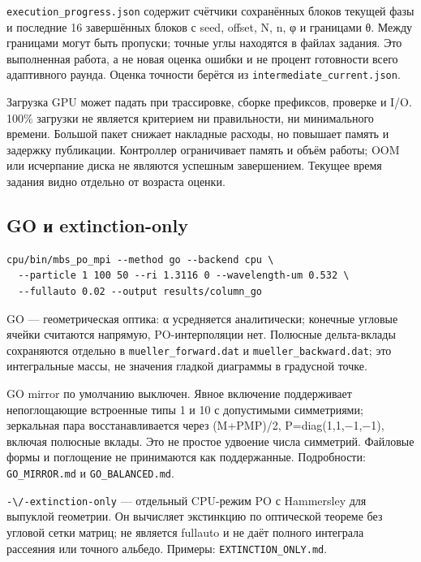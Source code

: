 \nolinkurl{execution_progress.json} содержит счётчики сохранённых блоков
текущей фазы и последние 16 завершённых блоков с seed, offset, N, n, φ и
границами θ. Между границами могут быть пропуски; точные углы находятся
в файлах задания. Это выполненная работа, а не новая оценка ошибки и не
процент готовности всего адаптивного раунда. Оценка точности берётся из
\nolinkurl{intermediate_current.json}.

Загрузка GPU может падать при трассировке, сборке префиксов, проверке и
I/O. 100\% загрузки не является критерием ни правильности, ни
минимального времени. Большой пакет снижает накладные расходы, но
повышает память и задержку публикации. Контроллер ограничивает память и
объём работы; OOM или исчерпание диска не являются успешным завершением.
Текущее время задания видно отдельно от возраста оценки.

\subsection{GO и extinction-only}\label{go-ux438-extinction-only}

\noindent\begin{minipage}{\linewidth}
\begin{verbatim}
cpu/bin/mbs_po_mpi --method go --backend cpu \
  --particle 1 100 50 --ri 1.3116 0 --wavelength-um 0.532 \
  --fullauto 0.02 --output results/column_go
\end{verbatim}
\end{minipage}

GO --- геометрическая оптика: α усредняется аналитически; конечные
угловые ячейки считаются напрямую, PO-интерполяции нет. Полюсные
дельта-вклады сохраняются отдельно в \nolinkurl{mueller_forward.dat} и
\nolinkurl{mueller_backward.dat}; это интегральные массы, не значения
гладкой диаграммы в градусной точке.

GO mirror по умолчанию выключен. Явное включение поддерживает
непоглощающие встроенные типы 1 и 10 с допустимыми симметриями;
зеркальная пара восстанавливается через (M+PMP)/2, P=diag(1,1,−1,−1),
включая полюсные вклады. Это не простое удвоение числа симметрий.
Файловые формы и поглощение не принимаются как поддержанные.
Подробности: \nolinkurl{GO_MIRROR.md} и \nolinkurl{GO_BALANCED.md}.

\nolinkurl{-\/-extinction-only} --- отдельный CPU-режим PO с Hammersley для
выпуклой геометрии. Он вычисляет экстинкцию по оптической теореме без
угловой сетки матриц; не является fullauto и не даёт полного интеграла
рассеяния или точного альбедо. Примеры: \nolinkurl{EXTINCTION_ONLY.md}.

